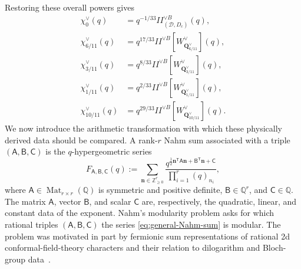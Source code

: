 \documentclass[11pt,a4paper]{article}
\numberwithin{equation}{section}
\begin{document}
Restoring these overall powers gives
\begin{align}
  \chi_0^\vee(q)
  &=q^{-1/33}I\!\!I_{(\mathcal D,D_c)}^{\vee B}(q),\nonumber\\
  \chi_{6/11}^\vee(q)
  &=q^{17/33}I\!\!I^{\vee B}[W^\vee_{\boldsymbol Q_{6/11}^\vee}](q),\nonumber\\
  \chi_{3/11}^\vee(q)
  &=q^{8/33}I\!\!I^{\vee B}[W^\vee_{\boldsymbol Q_{3/11}^\vee}](q),\nonumber\\
  \chi_{1/11}^\vee(q)
  &=q^{2/33}I\!\!I^{\vee B}[W^\vee_{\boldsymbol Q_{1/11}^\vee}](q),\nonumber\\
  \chi_{10/11}^\vee(q)
  &=q^{29/33}I\!\!I^{\vee B}[W^\vee_{\boldsymbol Q_{10/11}^\vee}](q).
  \label{eq:dual-Wilson-character-match}
\end{align}
We now introduce the arithmetic transformation with which these physically derived data should be compared.  A rank-$r$ Nahm sum associated with a triple $(\mathsf A,\mathsf B,\mathsf C)$ is the $q$-hypergeometric series
\begin{equation}
  F_{\mathsf A,\mathsf B,\mathsf C}(q)
  :=
  \sum_{\boldsymbol n\in\mathbb Z_{\geq0}^{r}}
  \frac{
  q^{\frac12\boldsymbol n^{\mathsf T}\mathsf A\boldsymbol n
  +\mathsf B^{\mathsf T}\boldsymbol n+\mathsf C}
  }{
  \prod_{i=1}^{r}(q)_{n_i}
  },
  \label{eq:general-Nahm-sum}
\end{equation}
where $\mathsf A\in\operatorname{Mat}_{r\times r}(\mathbb Q)$ is symmetric and positive definite, $\mathsf B\in\mathbb Q^r$, and $\mathsf C\in\mathbb Q$.  The matrix $\mathsf A$, vector $\mathsf B$, and scalar $\mathsf C$ are, respectively, the quadratic, linear, and constant data of the exponent.  Nahm's modularity problem asks for which rational triples $(\mathsf A,\mathsf B,\mathsf C)$ the series \eqref{eq:general-Nahm-sum} is modular.  The problem was motivated in part by fermionic sum representations of rational 2d conformal-field-theory characters and their relation to dilogarithm and Bloch-group data~\cite{Nahm:2004bloch,VlasenkoZwegers:2011nahm}.
\end{document}

